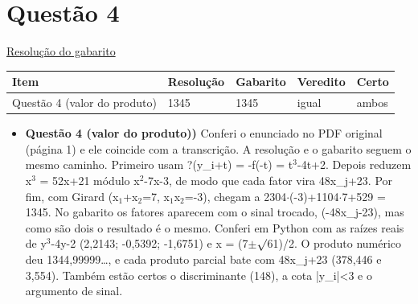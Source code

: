 \documentclass{article}%
\begin{document}
\section*{Questão 4}%
\href{https://poliedroresolve.sistemapoliedro.com.br/vestibulares/ime/2027/ime-2-fase-dia-1-26-10-2026-2-fase-dia-1/dissertativa-4-matematica-2-fase-dia-1-ime-2027}{Resolução do gabarito}\par\smallskip%
\begin{longtable}{@{}p{} p{} p{} p{} p{}@{}}\toprule Item & Resolução & Gabarito & Veredito & Certo \\ \midrule
Questão 4 (valor do produto) & 1345 & 1345 & igual & ambos \\
\bottomrule\end{longtable}%
\begin{itemize}%
\item%
\textbf{Questão 4 (valor do produto))} Conferi o enunciado no PDF original (página 1) e ele coincide com a transcrição. A resolução e o gabarito seguem o mesmo caminho. Primeiro usam ?(y\_i+t) = -f(-t) = t$^3$-4t+2. Depois reduzem x$^3$ = 52x+21 módulo x$^2$-7x-3, de modo que cada fator vira 48x\_j+23. Por fim, com Girard (x$_{1}$+x$_{2}$=7, x$_{1}$x$_{2}$=-3), chegam a 2304$\cdot$(-3)+1104$\cdot$7+529 = 1345. No gabarito os fatores aparecem com o sinal trocado, (-48x\_j-23), mas como são dois o resultado é o mesmo. Conferi em Python com as raízes reais de y$^3$-4y-2 (2,2143; -0,5392; -1,6751) e x = (7$\pm$$\surd$61)/2. O produto numérico deu 1344,99999\ldots{}, e cada produto parcial bate com 48x\_j+23 (378,446 e 3,554). Também estão certos o discriminante (148), a cota |y\_i|<3 e o argumento de sinal.%
\end{itemize}%
\end{document}
